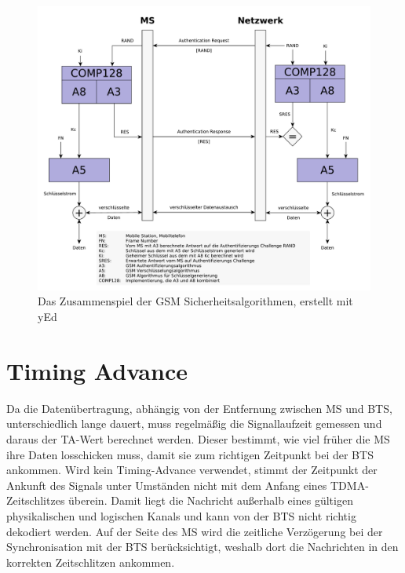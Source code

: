 \begin{figure}[H]
  \begin{center}
    \includegraphics[width=1.0\textwidth]{figures/gsm_security_overview.pdf}
  \end{center}
  \caption[Das Zusammenspiel der GSM Sicherheitsalgorithmen]{Das Zusammenspiel der \ac{GSM} Sicherheitsalgorithmen, erstellt mit yEd} \label{fig:encryption-overview}
\end{figure}

\section{Timing Advance}\label{hdl:ta}

Da die Datenübertragung, abhängig von der Entfernung zwischen \ac{MS} und \ac{BTS}, unterschiedlich lange dauert, muss regelmäßig die Signallaufzeit gemessen und daraus der \ac{TA}-Wert  berechnet werden. Dieser bestimmt, wie viel früher die \ac{MS} ihre Daten losschicken muss, damit sie zum richtigen Zeitpunkt bei der \ac{BTS} ankommen. Wird kein Timing-Advance verwendet, stimmt der Zeitpunkt der Ankunft des Signals unter Umständen nicht mit dem Anfang eines \ac{TDMA}-Zeitschlitzes überein. Damit liegt die Nachricht außerhalb eines gültigen physikalischen und logischen Kanals und kann von der \ac{BTS} nicht richtig dekodiert werden. Auf der Seite des \ac{MS} wird die zeitliche Verzögerung bei der Synchronisation mit der \ac{BTS} berücksichtigt, weshalb dort die Nachrichten in den korrekten Zeitschlitzen ankommen.


